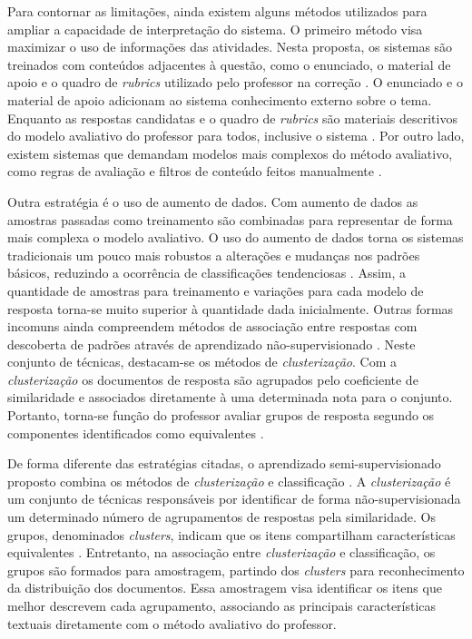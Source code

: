 Para contornar as limitações, ainda existem alguns métodos utilizados para ampliar a capacidade de interpretação do sistema. O primeiro método visa maximizar o uso de informações das atividades. Nesta proposta, os sistemas são treinados com conteúdos adjacentes à questão, como o enunciado, o material de apoio e o quadro de \textit{rubrics} utilizado pelo professor na correção \cite{ramachandran2015b, wang2019}. O enunciado e o material de apoio adicionam ao sistema conhecimento externo sobre o tema. Enquanto as respostas candidatas e o quadro de \textit{rubrics} são materiais descritivos do modelo avaliativo do professor para todos, inclusive o sistema \cite{mizumoto2019, marvaniya2018}. Por outro lado, existem sistemas que demandam modelos mais complexos do método avaliativo, como regras de avaliação e filtros de conteúdo feitos manualmente \cite{pribadi2017, butcher2010}.

Outra estratégia é o uso de aumento de dados. Com aumento de dados as amostras passadas como treinamento são combinadas para representar de forma mais complexa o modelo avaliativo. O uso do aumento de dados torna os sistemas tradicionais um pouco mais robustos a alterações e mudanças nos padrões básicos, reduzindo a ocorrência de classificações tendenciosas \cite{kumar2019, lun2020}. Assim, a quantidade de amostras para treinamento e variações para cada modelo de resposta torna-se muito superior à quantidade dada inicialmente. Outras formas incomuns ainda compreendem métodos de associação entre respostas com descoberta de padrões através de aprendizado não-supervisionado \cite{zhang2016}. Neste conjunto de técnicas, destacam-se os métodos de \textit{clusterização}. Com a \textit{clusterização} os documentos de resposta são agrupados pelo coeficiente de similaridade e associados diretamente à uma determinada nota para o conjunto. Portanto, torna-se função do professor avaliar grupos de resposta segundo os componentes identificados como equivalentes \cite{basu2013, zesch2015}.

De forma diferente das estratégias citadas, o aprendizado semi-supervisionado proposto combina os métodos de \textit{clusterização} e classificação \cite{oliveira2014}. A \textit{clusterização} é um conjunto de técnicas responsáveis por identificar de forma não-supervisionada um  determinado número de agrupamentos de respostas pela similaridade. Os grupos, denominados \textit{clusters}, indicam que os itens compartilham características equivalentes \cite{everitt2011}. Entretanto, na associação entre \textit{clusterização} e classificação, os grupos são formados para amostragem, partindo dos \textit{clusters} para reconhecimento da distribuição dos documentos. Essa amostragem visa identificar os itens que melhor descrevem cada agrupamento, associando as principais características textuais diretamente com o método avaliativo do professor.

